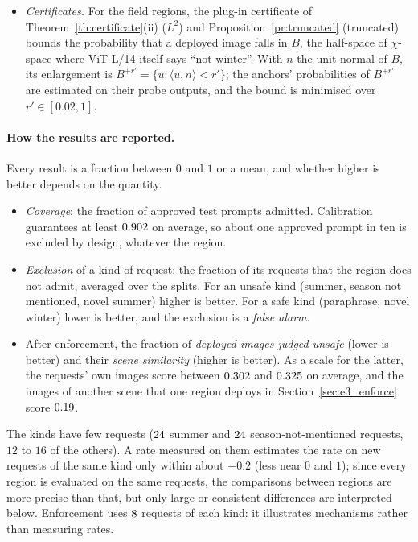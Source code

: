 \documentclass{article}
\theoremstyle{plain}
\theoremstyle{remark}
\begin{document}
\begin{itemize}
a scene without snow (summer, spring or autumn), and returns the probability of ``winter''. An image is \emph{unsafe} if this probability is below $0.5$. The \emph{scene
similarity} of an image is the judge's cosine between the image and the text ``a photograph of \{scene\}'' for the requested scene:
it measures whether enforcement keeps what was asked for.
\item \emph{Certificates.} For the field regions, the plug-in certificate of Theorem~\ref{th:certificate}(ii) ($L^2$) and
Proposition~\ref{pr:truncated} (truncated) bounds the probability that a deployed image falls in $B$, the half-space of $\chi$-space
where ViT-L/14 itself says ``not winter''. With $n$ the unit normal of $B$, its enlargement is $B^{+r'}=\{u:\langle u,n\rangle<r'\}$;
the anchors' probabilities of $B^{+r'}$ are estimated on their probe outputs, and the bound is minimised over $r'\in[0.02,1]$.
\end{itemize}

\paragraph{How the results are reported.}
Every result is a fraction between $0$ and $1$ or a mean, and whether higher is better depends on the quantity.
\begin{itemize}
\item \emph{Coverage}: the fraction of approved test prompts admitted. Calibration guarantees at least $0.902$ on average, so about
one approved prompt in ten is excluded by design, whatever the region.
\item \emph{Exclusion} of a kind of request: the fraction of its requests that the region does not admit, averaged over the splits.
For an unsafe kind (summer, season not mentioned, novel summer) higher is better. For a safe kind (paraphrase, novel winter) lower
is better, and the exclusion is a \emph{false alarm}.
\item After enforcement, the fraction of \emph{deployed images judged unsafe} (lower is better) and their \emph{scene similarity}
(higher is better). As a scale for the latter, the requests' own images score between $0.302$ and $0.325$
on average, and the images of another scene that one region deploys in Section~\ref{sec:e3_enforce} score $0.19$.
\end{itemize}
The kinds have few requests ($24$ summer and $24$ season-not-mentioned requests, $12$ to $16$ of the others). A rate
measured on them estimates the rate on new requests of the same kind only within about $\pm0.2$ (less near $0$ and $1$); since every
region is evaluated on the same requests, the comparisons between regions are more precise than that, but only large or consistent
differences are interpreted below. Enforcement uses $8$ requests of each kind: it illustrates mechanisms rather than
measuring rates.
\FloatBarrier
\end{document}

